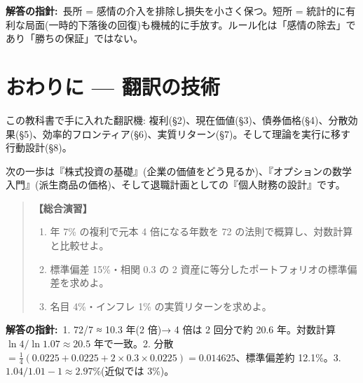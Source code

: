 \documentclass{article}
\begin{document}
\textbf{解答の指針:}\ 長所 = 感情の介入を排除し損失を小さく保つ。短所 = 統計的に有利な局面(一時的下落後の回復)も機械的に手放す。ルール化は「感情の除去」であり「勝ちの保証」ではない。

\section{おわりに — 翻訳の技術}

この教科書で手に入れた翻訳機: 複利(§2)、現在価値(§3)、債券価格(§4)、分散効果(§5)、効率的フロンティア(§6)、実質リターン(§7)。そして理論を実行に移す行動設計(§8)。

次の一歩は『株式投資の基礎』(企業の価値をどう見るか)、『オプションの数学入門』(派生商品の価格)、そして退職計画としての『個人財務の設計』です。

\begin{quote}
\textbf{【総合演習】}
\begin{enumerate}
\item 年 7\% の複利で元本 4 倍になる年数を 72 の法則で概算し、対数計算と比較せよ。
\item 標準偏差 15\%・相関 0.3 の 2 資産に等分したポートフォリオの標準偏差を求めよ。
\item 名目 4\%・インフレ 1\% の実質リターンを求めよ。
\end{enumerate}
\end{quote}

\textbf{解答の指針:}\ 1. 72/7 ≈ 10.3 年(2 倍)→ 4 倍は 2 回分で約 20.6 年。対数計算 \(\ln 4/\ln 1.07 \approx 20.5\) 年で一致。2. 分散 \(= \frac{1}{4}(0.0225 + 0.0225 + 2 \times 0.3 \times 0.0225) = 0.014625\)、標準偏差約 12.1\%。3. \(1.04/1.01 - 1 \approx 2.97\%\)(近似では 3\%)。
\end{document}
